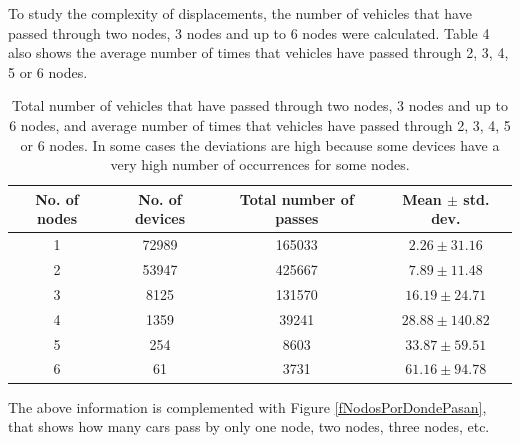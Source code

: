 \documentclass[preprint,authoryear,12pt]{elsarticle}
\begin{document}
To study the complexity of displacements, the number of vehicles that have passed through two nodes, 3 nodes and up to 6 nodes  were calculated. 
Table 4 also shows the average number of times that vehicles have passed through 2, 3, 4, 5 or 6 nodes.

 \begin{table}
 \begin{center}
 \begin{tabular}{|c|c|c|c|}
 \hline
 No. of nodes & 	No. of devices & 	Total number of passes & 	Mean $\pm$ std. dev.  \\
 \hline
1 & 	72989 & 	 165033 & 	$2.26 \pm 31.16$  \\
 \hline
2 & 	53947 & 	 425667 & 	$7.89 \pm 11.48$  \\
 \hline
3 & 	8125 & 	 131570 & 	$16.19 \pm 24.71$  \\
 \hline
4 & 	1359 & 	 39241 & 	$28.88 \pm 140.82$  \\
 \hline
5 & 	254 & 	 8603 & 	$33.87 \pm 59.51$  \\
 \hline
6 & 	61 & 	 3731 & 	$61.16 \pm 94.78$  \\
 \hline
 \end{tabular}
 \end{center}
 \caption{Total number of vehicles that have passed through two nodes, 3 nodes and up to 6 nodes, and average number of times that vehicles have passed through 2, 3, 4, 5 or 6 nodes. In some cases the deviations are high because some devices have a very high number of occurrences for some nodes.
 \label{tNodosPorDondePasan}}
 \end{table}

The above information is complemented with Figure \ref{fNodosPorDondePasan}, that shows how many cars pass by only one node, two nodes, three nodes, etc.
\end{document}
